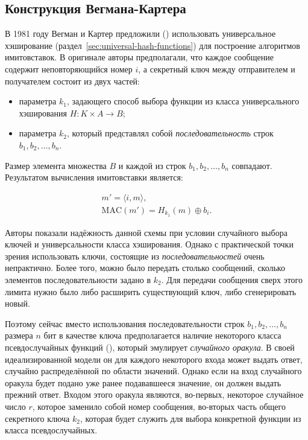 \subsection{Конструкция Вегмана-Картера}

В 1981 году Вегман и Картер предложили (\cite{Wegman:Carter:1981}) использовать универсальное хэширование (раздел~\ref{sec:universal-hash-functions}) для построение алгоритмов имитовставок. В оригинале авторы предполагали, что каждое сообщение содержит неповторяющийся номер $i$, а секретный ключ между отправителем и получателем состоит из двух частей:

\begin{itemize}
    \item параметра $k_1$, задающего способ выбора функции из класса универсального хэширования $H: K \times A \to B$;
    \item параметра $k_2$, который представлял собой \emph{последовательность} строк $b_1, b_2, \dots, b_n$.
\end{itemize}

Размер элемента множества $B$ и каждой из строк $b_1, b_2, \dots, b_n$ совпадают. Результатом вычисления имитовставки является:

\[ \begin{array}{l}
    m' = \langle i, m \rangle,\\
    \textrm{MAC} (m') = H_{k_1}(m) \oplus b_i.
\end{array} \]

Авторы показали надёжность данной схемы при условии случайного выбора ключей и универсальности класса хэширования. Однако с практической точки зрения использовать ключи, состоящие из \emph{последовательностей} очень непрактично. Более того, можно было передать столько сообщений, сколько элементов последовательности задано в $k_2$. Для передачи сообщения сверх этого лимита нужно было либо расширить существующий ключ, либо сгенерировать новый.

Поэтому сейчас вместо использования последовательности строк $b_1, b_2, \dots, b_n$ размера $n$ бит в качестве ключа предполагается наличие некоторого класса псевдослучайных функций (), который эмулирует \emph{случайного оракула}. В своей идеализированной модели он для каждого некоторого входа может выдать ответ, случайно распределённой по области значений. Однако если на вход случайного оракула будет подано уже ранее подававшееся значение, он должен выдать прежний ответ. Входом этого оракула являются, во-первых, некоторое случайное число $r$, которое заменило собой номер сообщения, во-вторых часть общего секретного ключа $k_2$, которая будет служить для выбора конкретной функции из класса псевдослучайных.

